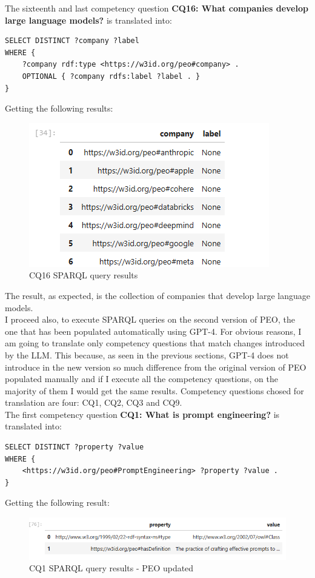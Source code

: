 The sixteenth and last competency question \textbf{CQ16: What companies develop large language models?} is translated into:
\begin{lstlisting}
SELECT DISTINCT ?company ?label
WHERE {
    ?company rdf:type <https://w3id.org/peo#company> .
    OPTIONAL { ?company rdfs:label ?label . }
}
\end{lstlisting}
Getting the following results:
\begin{figure}[H]
    \centering
    \includegraphics[width=0.8\linewidth]{Figures/fig_62.png}
    \caption{CQ16 SPARQL query results}
    \label{fig:enter-label}
\end{figure}
The result, as expected, is the collection of companies that develop large language models.\\
I proceed also, to execute SPARQL queries on the second version of PEO, the one that has been populated automatically using GPT-4. For obvious reasons, I am going to translate only competency questions that match changes introduced by the LLM. This because, as seen in the previous sections, GPT-4 does not introduce in the new version so much difference from the original version of PEO populated manually and if I execute all the competency questions, on the majority of them I would get the same results. Competency questions chosed for translation are four: CQ1, CQ2, CQ3 and CQ9.\\
The first competency question \textbf{CQ1: What is prompt engineering?} is translated into:
\begin{lstlisting}
SELECT DISTINCT ?property ?value
WHERE {
    <https://w3id.org/peo#PromptEngineering> ?property ?value .
} 
\end{lstlisting}
Getting the following result:
\begin{figure}[H]
    \centering
    \includegraphics[width=0.9\linewidth]{Figures/fig_69.png}
    \caption{CQ1 SPARQL query results - PEO updated}
    \label{fig:enter-label}
\end{figure}

